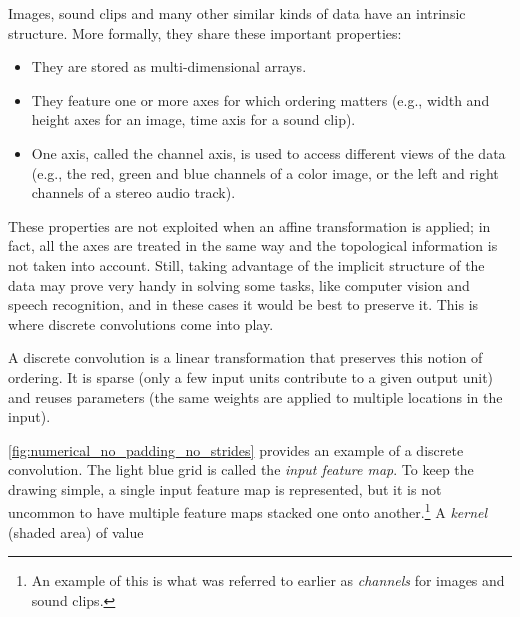 \documentclass[notitlepage]{report}
\begin{document}
Images, sound clips and many other similar kinds of data have an intrinsic
structure. More formally, they share these important properties:

\begin{itemize}
    \item They are stored as multi-dimensional arrays.
    \item They feature one or more axes for which ordering matters (e.g., width
        and height axes for an image, time axis for a sound clip).
    \item One axis, called the channel axis, is used to access different views
        of the data (e.g., the red, green and blue channels of a color image, or
        the left and right channels of a stereo audio track).
\end{itemize}

These properties are not exploited when an affine transformation is applied; in
fact, all the axes are treated in the same way and the topological information
is not taken into account. Still, taking advantage of the implicit structure of
the data may prove very handy in solving some tasks, like computer vision and
speech recognition, and in these cases it would be best to preserve it. This is
where discrete convolutions come into play.

A discrete convolution is a linear transformation that preserves this notion of
ordering. It is sparse (only a few input units contribute to a given output
unit) and reuses parameters (the same weights are applied to multiple locations
in the input).

\autoref{fig:numerical_no_padding_no_strides} provides an example of a discrete
convolution. The light blue grid is called the {\em input feature map}. To keep
the drawing simple, a single input feature map is represented, but it is not
uncommon to have multiple feature maps stacked one onto another.\footnote{%
    An example of this is what was referred to earlier as {\em channels\/} for
    images and sound clips.}
A {\em kernel\/} (shaded area) of value

\begin{figure}[H]
    \centering
\end{figure}
\end{document}

